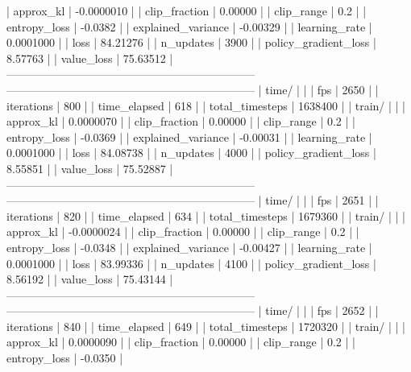 |    approx_kl            |   -0.0000010 |
|    clip_fraction        |      0.00000 |
|    clip_range           |          0.2 |
|    entropy_loss         |      -0.0382 |
|    explained_variance   |     -0.00329 |
|    learning_rate        |    0.0001000 |
|    loss                 |     84.21276 |
|    n_updates            |         3900 |
|    policy_gradient_loss |      8.57763 |
|    value_loss           |     75.63512 |
------------------------------------------------------------------
------------------------------------------------------------------
| time/                   |              |
|    fps                  |         2650 |
|    iterations           |          800 |
|    time_elapsed         |          618 |
|    total_timesteps      |      1638400 |
| train/                  |              |
|    approx_kl            |    0.0000070 |
|    clip_fraction        |      0.00000 |
|    clip_range           |          0.2 |
|    entropy_loss         |      -0.0369 |
|    explained_variance   |     -0.00031 |
|    learning_rate        |    0.0001000 |
|    loss                 |     84.08738 |
|    n_updates            |         4000 |
|    policy_gradient_loss |      8.55851 |
|    value_loss           |     75.52887 |
------------------------------------------------------------------
------------------------------------------------------------------
| time/                   |              |
|    fps                  |         2651 |
|    iterations           |          820 |
|    time_elapsed         |          634 |
|    total_timesteps      |      1679360 |
| train/                  |              |
|    approx_kl            |   -0.0000024 |
|    clip_fraction        |      0.00000 |
|    clip_range           |          0.2 |
|    entropy_loss         |      -0.0348 |
|    explained_variance   |     -0.00427 |
|    learning_rate        |    0.0001000 |
|    loss                 |     83.99336 |
|    n_updates            |         4100 |
|    policy_gradient_loss |      8.56192 |
|    value_loss           |     75.43144 |
------------------------------------------------------------------
------------------------------------------------------------------
| time/                   |              |
|    fps                  |         2652 |
|    iterations           |          840 |
|    time_elapsed         |          649 |
|    total_timesteps      |      1720320 |
| train/                  |              |
|    approx_kl            |    0.0000090 |
|    clip_fraction        |      0.00000 |
|    clip_range           |          0.2 |
|    entropy_loss         |      -0.0350 |
